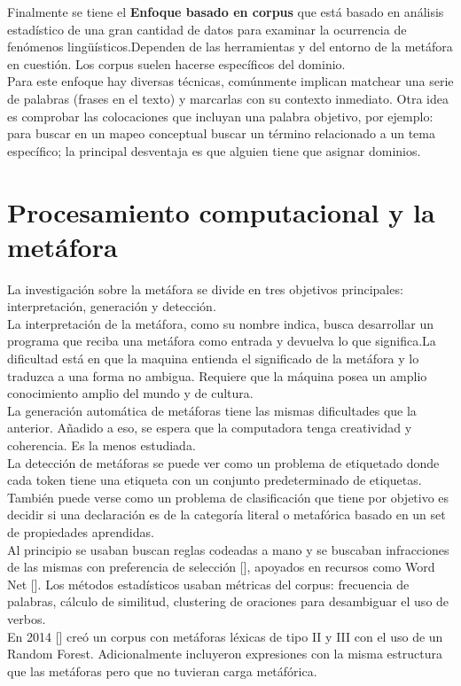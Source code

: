 Finalmente se tiene el \textbf{Enfoque basado en corpus} que está basado en análisis estadístico de una gran cantidad de datos para examinar la ocurrencia de fenómenos lingüísticos.Dependen de las herramientas y del entorno de la metáfora en cuestión. Los corpus suelen hacerse específicos del dominio.\\
Para este enfoque hay diversas técnicas, comúnmente implican matchear una serie de palabras (frases en el texto) y marcarlas con su contexto inmediato. Otra idea es comprobar las colocaciones que incluyan una palabra objetivo, por ejemplo: para buscar en un mapeo conceptual buscar un término relacionado a un tema específico; la principal desventaja es que alguien tiene que asignar dominios.

\section{Procesamiento computacional y la metáfora}
La investigación sobre la metáfora se divide en tres objetivos principales: interpretación, generación y detección.\\
La interpretación de la metáfora, como su nombre indica, busca desarrollar un programa que reciba una metáfora como entrada y devuelva lo que significa.La dificultad está en que la maquina entienda el significado de la metáfora y lo traduzca a una forma no ambigua. Requiere que la máquina posea un amplio conocimiento amplio del mundo y de cultura.\\
La generación automática de metáforas tiene las mismas dificultades que la anterior. Añadido a eso, se espera que la computadora tenga creatividad y coherencia. Es la menos estudiada.\\
La detección de metáforas se puede ver como un problema de etiquetado donde cada token tiene una etiqueta con un conjunto predeterminado de etiquetas. También puede verse como un problema de clasificación que tiene por objetivo es decidir si una declaración es de la categoría literal o metafórica basado en un set de propiedades aprendidas.\\
Al principio se usaban buscan reglas codeadas a mano y se buscaban infracciones de las mismas con preferencia de selección [\cite{Fass}], apoyados en recursos como Word Net [\cite{Manson}]. Los métodos estadísticos usaban métricas del corpus: frecuencia de palabras, cálculo de similitud, clustering de oraciones para desambiguar el uso de verbos. \\
En 2014 [\cite{Tsvetkov}] creó un corpus con metáforas léxicas de tipo II y III con el uso de un Random Forest. Adicionalmente incluyeron expresiones con la misma estructura que las metáforas pero que no tuvieran carga metáfórica.\\

